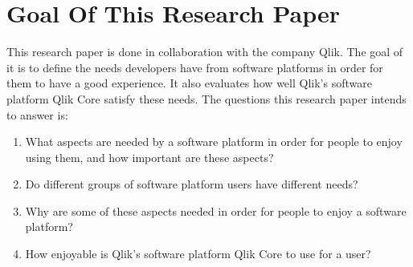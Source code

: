 \documentclass{cslthse-msc}
\begin{document}
    \section{Goal Of This Research Paper}
    This research paper is done in collaboration with the company Qlik. The goal of it is to define the needs developers have from software platforms in order for them to have a good experience. It also evaluates how well Qlik's software platform Qlik Core satisfy these needs. The questions this research paper intends to answer is:
    \begin{enumerate}
        \item What aspects are needed by a software platform in order for people to enjoy using them, and how important are these aspects?
        \item Do different groups of software platform users have different needs?
        \item Why are some of these aspects needed in order for people to enjoy a software platform?
        \item How enjoyable is Qlik's software platform Qlik Core to use for a user?
    \end{enumerate}
\end{document}

